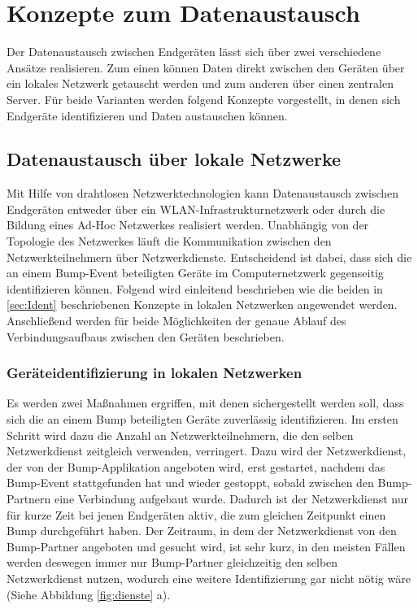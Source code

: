 \newpage
\section{Konzepte zum Datenaustausch}
\label{sec:Austausch}
Der Datenaustausch zwischen Endgeräten lässt sich über zwei verschiedene Ansätze realisieren. Zum einen können Daten direkt zwischen den Geräten über ein lokales Netzwerk getauscht werden und zum anderen über einen zentralen Server. Für beide Varianten werden folgend Konzepte vorgestellt, in denen sich Endgeräte identifizieren und Daten austauschen können.

\subsection{Datenaustausch über lokale Netzwerke}
Mit Hilfe von drahtlosen Netzwerktechnologien kann Datenaustausch zwischen Endgeräten entweder über ein WLAN-Infrastrukturnetzwerk oder durch die Bildung eines Ad-Hoc Netzwerkes realisiert werden. Unabhängig von der Topologie des Netzwerkes läuft die Kommunikation zwischen den Netzwerkteilnehmern über Netzwerkdienste. Entscheidend ist dabei, dass sich die an einem Bump-Event beteiligten Geräte im Computernetzwerk gegenseitig identifizieren können. Folgend wird einleitend beschrieben wie die beiden in \ref{sec:Ident} beschriebenen Konzepte in lokalen Netzwerken angewendet werden. Anschließend werden für beide Möglichkeiten der genaue Ablauf des Verbindungsaufbaus zwischen den Geräten beschrieben.

\subsubsection{Geräteidentifizierung in lokalen Netzwerken}
Es werden zwei Maßnahmen ergriffen, mit denen sichergestellt werden soll, dass sich die an einem Bump beteiligten Geräte zuverlässig identifizieren. Im ersten Schritt wird dazu die Anzahl an Netzwerkteilnehmern, die den selben Netzwerkdienst zeitgleich verwenden, verringert. Dazu wird der Netzwerkdienst, der von der Bump-Applikation angeboten wird, erst gestartet, nachdem das Bump-Event stattgefunden hat und wieder gestoppt, sobald zwischen den Bump-Partnern eine Verbindung aufgebaut wurde. Dadurch ist der Netzwerkdienst nur für kurze Zeit bei jenen Endgeräten aktiv, die zum gleichen Zeitpunkt einen Bump durchgeführt haben. Der Zeitraum, in dem der Netzwerkdienst von den Bump-Partner angeboten und gesucht wird, ist sehr kurz, in den meisten Fällen werden deswegen immer nur Bump-Partner gleichzeitig den selben Netzwerkdienst nutzen, wodurch eine weitere Identifizierung gar nicht nötig wäre (Siehe Abbildung \ref{fig:dienste} a).

